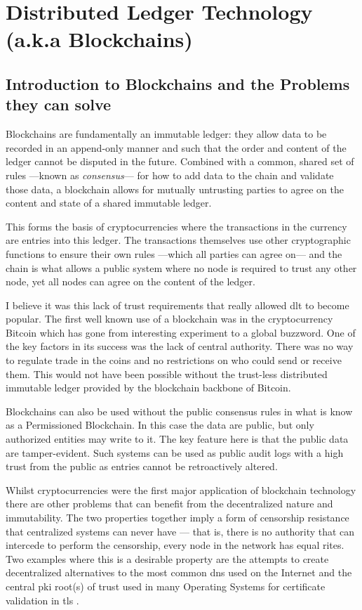 
\chapter{Distributed Ledger Technology (a.k.a Blockchains)}
\label{ch:blockchain}

\section{Introduction to Blockchains and the Problems they can solve}
\label{ch:blockchain:intro}

Blockchains are fundamentally an immutable ledger: they allow data to be recorded in an append-only manner and such that the order and content of the ledger cannot be disputed in the future. Combined with a common, shared set of rules ---known as \emph{consensus}--- for how to add data to the chain and validate those data, a blockchain allows for mutually untrusting parties to agree on the content and state of a shared immutable ledger.

This forms the basis of cryptocurrencies where the transactions in the currency are entries into this ledger. The transactions themselves use other cryptographic functions to ensure their own rules ---which all parties can agree on--- and the chain is what allows a public system where no node is required to trust any other node, yet all nodes can agree on the content of the ledger.

I believe it was this lack of trust requirements that really allowed \gls{dlt} to become popular. The first well known use of a blockchain was in the cryptocurrency Bitcoin which has gone from interesting experiment to a global buzzword. One of the key factors in its success was the lack of central authority. There was no way to regulate trade in the coins and no restrictions on who could send or receive them. This would not have been possible without the trust-less distributed immutable ledger provided by the blockchain backbone of Bitcoin.

Blockchains can also be used without the public consensus rules in what is know as a Permissioned Blockchain. In this case the data are public, but only authorized entities may write to it. The key feature here is that the public data are tamper-evident. Such systems can be used as public audit logs with a high trust from the public as entries cannot be retroactively altered.

Whilst cryptocurrencies were the first major application of blockchain technology there are other problems that can benefit from the decentralized nature and immutability. The two properties together imply a form of censorship resistance that centralized systems can never have --- that is, there is no authority that can intercede to perform the censorship, every node in the network has equal rites. Two examples where this is a desirable property are  the attempts to create decentralized alternatives to the most common \gls{dns} used on the Internet \cite{Namecoin,ENSEthereumName,UnstoppableDomainsDocumentation} and the central \gls{pki} root(s) of trust used in many Operating Systems for certificate validation in \gls{tls} \cite{yakubovBlockchainbasedPKIManagement2018,kubilayCertLedgerNewPKI2019,matsumotoIKPTurningPKI2016}.

